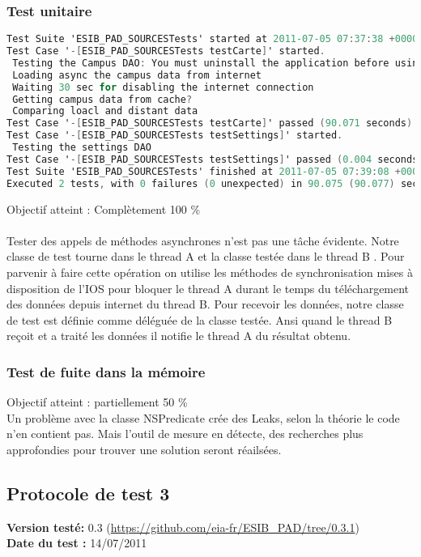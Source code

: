 		 		 \subsubsection*{Test unitaire}
		 		 \begin{lstlisting}[language=C,caption = Log des test unitaires]
Test Suite 'ESIB_PAD_SOURCESTests' started at 2011-07-05 07:37:38 +0000
Test Case '-[ESIB_PAD_SOURCESTests testCarte]' started.
 Testing the Campus DAO: You must uninstall the application before using this test
 Loading async the campus data from internet
 Waiting 30 sec for disabling the internet connection
 Getting campus data from cache?
 Comparing loacl and distant data
Test Case '-[ESIB_PAD_SOURCESTests testCarte]' passed (90.071 seconds).
Test Case '-[ESIB_PAD_SOURCESTests testSettings]' started.
 Testing the settings DAO
Test Case '-[ESIB_PAD_SOURCESTests testSettings]' passed (0.004 seconds).
Test Suite 'ESIB_PAD_SOURCESTests' finished at 2011-07-05 07:39:08 +0000.
Executed 2 tests, with 0 failures (0 unexpected) in 90.075 (90.077) seconds
		 		 \end{lstlisting}
		 		Objectif atteint : {\color{green}Complètement 100 \% \CheckedBox}\\
		 		\\
		 		Tester des appels de méthodes asynchrones n'est pas une tâche évidente. Notre classe de test tourne dans le thread A et la classe testée dans le thread B . Pour parvenir à faire cette opération on utilise les méthodes de synchronisation mises à disposition de l'IOS pour bloquer le thread A durant le temps du téléchargement des données depuis internet du thread B. Pour recevoir les données, notre classe de test est définie comme déléguée de la classe testée. Ansi quand le thread B  reçoit et a traité les données il notifie le thread A du résultat obtenu.
		 		 \subsubsection*{Test de fuite dans la mémoire}
		 		 Objectif atteint : {\color{red}partiellement 50 \% \CheckedBox}\\
		 		 Un problème avec la classe NSPredicate crée des Leaks, selon la théorie le code n'en contient pas. Mais l'outil de mesure en détecte, des recherches plus approfondies pour trouver une solution seront réailsées.
		 
		\subsection{Protocole de test 3}
		 		\textbf{Version testé:} 0.3 (\url{https://github.com/eia-fr/ESIB_PAD/tree/0.3.1}) \\
		 		\textbf{	Date du test :} 14/07/2011
		 
